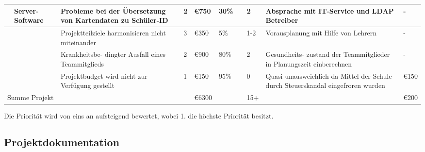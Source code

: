 \begin{center}
\begin{tiny}
\begin{tabularx}{\textwidth}{|l|p{1.1cm}|X|l|l|l|p{0.5cm}|l|X|X|}
    \hline
    [0302]& Server-Software & Probleme bei der Übersetzung von Kartendaten zu Schüler-ID & 2 & €750 & 30\% & & 2 & Absprache mit IT-Service und LDAP Betreiber & -\\
    \hline
    & & Projektteilziele harmonisieren nicht miteinander & 3 & €350 & 5\% & & 1-2 & Vorausplanung mit Hilfe von Lehrern & -\\
    \hline
    & & Krankheitsbe- dingter Ausfall eines Teammitglieds & 2 & €900 & 80\% & & 2 & Gesundheits- zustand der Teammitglieder in Planungszeit einberechnen & -\\
    \hline
    & & Projektbudget wird nicht zur Verfügung gestellt & 1 & €150 & 95\% & & 0 & Quasi unausweichlich da Mittel der Schule durch Steuerskandal eingefroren wurden & €150\\
    \hline
    \multicolumn{2}{|l|}{Summe Projekt} & & & €6300 & & & 15+ & &€200\\
    \hline
\end{tabularx}
\end{tiny}
\end{center}
\endgroup
\begin{flushleft}
Die Priorität wird von eins an aufsteigend bewertet, wobei 1. die höchste Priorität besitzt.
\end{flushleft}
\newpage

\subsection{Projektdokumentation}

